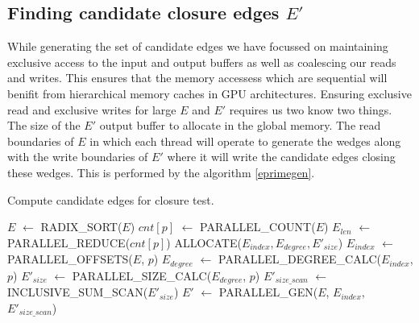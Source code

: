 \documentclass[conference]{IEEEtran}
\begin{document}
\subsection{Finding candidate closure edges $E'$}
While generating the set of candidate edges we have focussed on maintaining exclusive access to the input and output buffers as well as coalescing our reads and writes. This ensures that the memory accessess which are sequential  will benifit from hierarchical memory caches in GPU architectures. Ensuring exclusive read and exclusive writes for large $E$ and $E'$ requires us two know two things. The size of the $E'$ output buffer to allocate in the global memory. The read boundaries of $E$ in which each thread will operate to generate the wedges along with the write boundaries of $E'$ where it will write the candidate edges closing these wedges. This is performed by the algorithm \ref{eprimegen}.

\begin{algorithm}
  \caption{Compute candidate edges for closure test.\label{eprimegen}}  
  \begin{algorithmic}[1]
    \Statex
      \State $E$ $\gets$ RADIX\_SORT($E$)  \label{cubs_radix_sort}
      \State $cnt[p]$ $\gets$ PARALLEL\_COUNT($E$)  \label{par_cnt}
      \State $E_{len}$ $\gets$ PARALLEL\_REDUCE($cnt[p]$) \label{par_red}
      \State ALLOCATE($E_{index}, E_{degree}, E'_{size}$) 
      \State $E_{index}$ $\gets$ PARALLEL\_OFFSETS($E$, $p$) \label{par_offset}
      \State $E_{degree}$ $\gets$ PARALLEL\_DEGREE\_CALC($E_{index}$, $p$) \label{par_deg_calc}
      \State $E'_{size}$ $\gets$ PARALLEL\_SIZE\_CALC($E_{degree}$, $p$) \label{par_size_calc}
      \State $E'_{size\_scan}$ $\gets$ INCLUSIVE\_SUM\_SCAN($E'_{size}$)
      \State $E'$ $\gets$ PARALLEL\_GEN($E$, $E_{index}$, $E'_{size\_scan}$) \label{par_gen}
      \State {}
    \EndFunction
  \end{algorithmic}
\end{algorithm}
\end{document}
